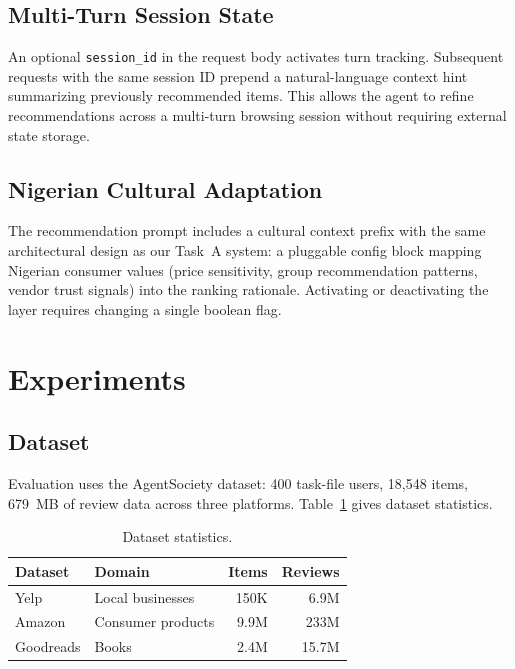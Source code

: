 \documentclass[11pt]{article}
\begin{document}
\subsection{Multi-Turn Session State}

An optional \texttt{session\_id} in the request body activates turn tracking.
Subsequent requests with the same session ID prepend a natural-language context
hint summarizing previously recommended items.
This allows the agent to refine recommendations across a multi-turn browsing
session without requiring external state storage.

\subsection{Nigerian Cultural Adaptation}

The recommendation prompt includes a cultural context prefix with the same
architectural design as our Task~A system: a pluggable config block mapping
Nigerian consumer values (price sensitivity, group recommendation patterns,
vendor trust signals) into the ranking rationale.
Activating or deactivating the layer requires changing a single boolean flag.

\section{Experiments}

\subsection{Dataset}

Evaluation uses the AgentSociety dataset: 400 task-file users, 18,548 items,
679~MB of review data across three platforms.
Table~\ref{tab:datasets} gives dataset statistics.

\begin{table}[h]
\centering
\small
\begin{tabular}{llrr}
\toprule
\textbf{Dataset} & \textbf{Domain} & \textbf{Items} & \textbf{Reviews} \\
\midrule
Yelp        & Local businesses  & 150K  & 6.9M  \\
Amazon      & Consumer products & 9.9M  & 233M  \\
Goodreads   & Books             & 2.4M  & 15.7M \\
\bottomrule
\end{tabular}
\caption{Dataset statistics.}
\label{tab:datasets}
\end{table}
\end{document}
